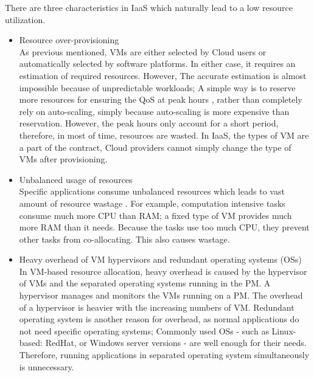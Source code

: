 There are three characteristics in IaaS which naturally lead to a low resource utilization.
\begin{itemize}
	\item Resource over-provisioning \\
	As previous mentioned, VMs are either selected by Cloud users or automatically selected by software platforms. In either case, it requires an estimation of required resources. However, The accurate estimation is almost impossible because of unpredictable workloads; A simple way is to reserve more resources for ensuring the QoS at peak hours \cite{Chaisiri:2012cva}, rather than completely rely on auto-scaling, simply because auto-scaling is more expensive than reservation. However, the peak hours only account for a short period, therefore, in most of time, resources are wasted. In IaaS, the types of VM are a part of the contract, Cloud providers cannot simply change the type of VMs after provisioning.

	\item Unbalanced usage of resources \\
	Specific applications consume unbalanced resources which leads to vast amount of resource wastage \cite{Tomas:2013iv}. For example, computation intensive tasks consume much more CPU than RAM; a fixed type of VM provides much more RAM than it needs. Because the tasks use too much CPU, they prevent other tasks from co-allocating. This also causes wastage.

	\item Heavy overhead of VM hypervisors and redundant operating systems (OSs) \\
	In VM-based resource allocation, heavy overhead is caused by
	the hypervisor of VMs and the separated operating systems running in the PM. A hypervisor manages and monitors the VMs running on a PM. The overhead of a hypervisor is heavier with the increasing numbers of VM. Redundant operating system is another reason for overhead, as normal applications do not need specific operating systems; Commonly used OSs - such as Linux-based: RedHat, or Windows server versions - are well enough for their needs. Therefore, running applications in separated operating system simultaneously is unnecessary.
\end{itemize}


